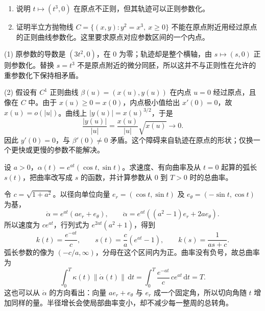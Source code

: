 \BookExercises

\begin{exercise}\label{g1:ex:curve-cusp-regularity}
	\begin{enumerate}
		\item 说明 \(t\mapsto(t^3,0)\) 在原点不正则，但其轨迹可以正则参数化。
		\item 证明半立方抛物线 \(C=\{(x,y):y^2=x^3,\ x\ge0\}\) 不能在原点附近用经过原点的正则曲线参数化。这里要求原点对应参数区间的一个内点。
	\end{enumerate}
\end{exercise}
\begin{solution}
	(1) 原参数的导数是 \((3t^2,0)\)，在 \(0\) 为零；轨迹却是整个横轴，由 \(s\mapsto(s,0)\) 正则参数化。替换 \(s=t^3\) 不是原点附近的微分同胚，所以这并不与正则性在允许的重参数化下保持相矛盾。

	(2) 假设有 \(C^1\) 正则曲线 \(\beta(u)=(x(u),y(u))\) 在内点 \(u=0\) 经过原点，且像在 \(C\) 中。由于 \(x(u)\ge0=x(0)\)，内点极小值给出 \(x'(0)=0\)，故 \(x(u)=o(|u|)\)。曲线上 \(|y(u)|=x(u)^{3/2}\)，于是
	\[
		\frac{|y(u)|}{|u|}=\frac{x(u)}{|u|}\sqrt{x(u)}\longrightarrow0.
	\]
	因此 \(y'(0)=0\)，与 \(\beta'(0)\ne0\) 矛盾。这个障碍来自轨迹在原点的形状；仅换一个更快或更慢的参数不能解决。
\end{solution}

\begin{exercise}\label{g1:ex:logarithmic-spiral}
	设 \(a>0\)，\(\alpha(t)=e^{at}(\cos t,\sin t)\)。求速度、有向曲率及从 \(t=0\) 起算的弧长 \(s(t)\)，把曲率改写成 \(s\) 的函数，并计算参数从 \(0\) 到 \(T>0\) 时的总曲率。
\end{exercise}
\begin{solution}
	令 \(c=\sqrt{1+a^2}\)。以径向单位向量 \(e_r=(\cos t,\sin t)\) 及 \(e_\theta=(-\sin t,\cos t)\) 为基，
	\[
		\dot\alpha=e^{at}(ae_r+e_\theta),\qquad
		\ddot\alpha=e^{at}((a^2-1)e_r+2ae_\theta).
	\]
	所以速度为 \(ce^{at}\)，行列式为 \(e^{2at}(a^2+1)\)，得到
	\[
		k(t)=\frac{e^{-at}}c,\qquad
		s(t)=\frac ca(e^{at}-1),\qquad
		k(s)=\frac1{as+c}.
	\]
	弧长参数的像为 \((-c/a,\infty)\)，分母在这个区间内为正。曲率没有负号，故总曲率为
	\[
		\int_0^T\kappa(t)\lVert\dot\alpha(t)\rVert\,\mathrm dt
		=\int_0^T\frac{e^{-at}}c\,ce^{at}\,\mathrm dt=T.
	\]
	这也可以从 \(\dot\alpha\) 的方向看出：向量 \(ae_r+e_\theta\) 与 \(e_r\) 成一个固定角，所以切向角随 \(t\) 增加同样的量。半径增长会使局部曲率变小，却不减少每一整周的总转角。
\end{solution}

